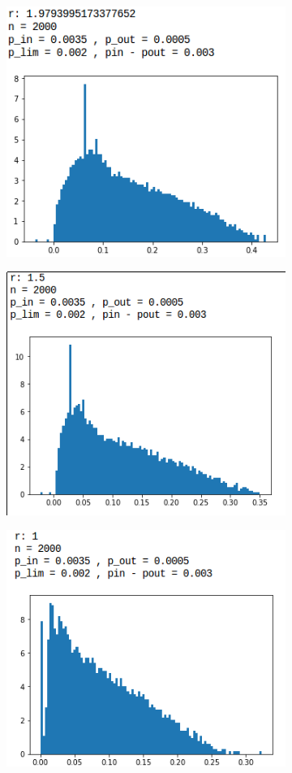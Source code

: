 \begin{figure}[H]
\begin{subfigure}{.5\textwidth}
		\label{bh3}
	\end{subfigure}
	\begin{subfigure}{.5\textwidth}
		\centering
		\includegraphics[scale=0.58]{static/bh_2.png}
		\label{bh2}
	\end{subfigure}
	\begin{subfigure}{.5\textwidth}
		\centering
		\includegraphics[scale=0.58]{static/bh_1_5.png}
		\label{bh15}
	\end{subfigure}
	\begin{subfigure}{.5\textwidth}
		\centering
		\includegraphics[scale=0.58]{static/bh_1.png}

\end{subfigure}
\end{figure}
